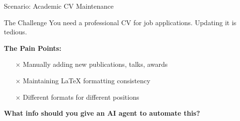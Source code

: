 \documentclass[aspectratio=169]{beamer}
\begin{document}
\begin{frame}{Scenario: Academic CV Maintenance}
  \begin{block}{The Challenge}
    You need a professional CV for job applications. Updating it is tedious.
  \end{block}

  \vspace{0.4cm}
  \textbf{The Pain Points:}
  \begin{itemize}
    \item[$\times$] Manually adding new publications, talks, awards
    \item[$\times$] Maintaining LaTeX formatting consistency
    \item[$\times$] Different formats for different positions
  \end{itemize}

  \vspace{0.5cm}
  \begin{center}
    \textcolor{conesaTeal}{\textbf{What info should you give an AI agent to automate this?}}
  \end{center}
\end{frame}
\end{document}
